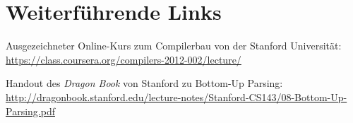 \section{Weiterführende Links}

Ausgezeichneter Online-Kurs zum Compilerbau von der Stanford
Universität:\\
\url{https://class.coursera.org/compilers-2012-002/lecture/}

Handout des \textit{Dragon Book} von Stanford zu Bottom-Up Parsing:\\
\url{http://dragonbook.stanford.edu/lecture-notes/Stanford-CS143/08-Bottom-Up-Parsing.pdf}

